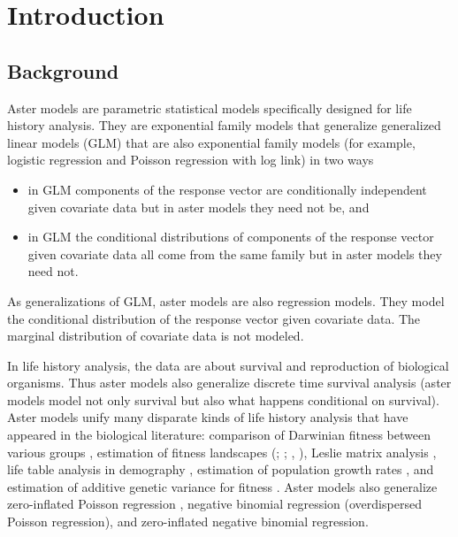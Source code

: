 
\chapter{Introduction}
\label{ch:introduction}

\section{Background}
\label{sec:background}

Aster models \citep*{aster1,aster2,reaster} 
are parametric statistical models
specifically designed for life history analysis.  They are exponential family
models that generalize generalized linear models (GLM) that are also
exponential family models (for example, logistic regression and
Poisson regression with log link) in two ways
\begin{itemize}
\item in GLM components of the response vector are
    conditionally independent given covariate data
    but in aster models they need not be, and
\item in GLM the conditional distributions of components of the
    response vector given covariate data all come from the same family
    but in aster models they need not.
\end{itemize}
As generalizations of GLM, aster models are also regression models.
They model the conditional distribution of the response vector given
covariate data.  The marginal distribution of covariate data is not
modeled.

In life history analysis,
the data are about survival and reproduction
of biological organisms.  Thus aster models also generalize discrete time
survival analysis (aster models model not only survival but also
what happens conditional on survival).
Aster models unify many disparate kinds of life history analysis that have
appeared in the biological literature: comparison of Darwinian fitness between
various groups \citep{aster1,aster2}, estimation of fitness landscapes
(\citealp{lande-arnold}; \citealp{mitchell-olds-shaw}; \citealp{aster2,aster3},
\citealp*{aster-hornworm}),
Leslie matrix analysis
\citep{caswell}, life table analysis in demography \citep{goodman},
estimation of population growth rates
\citep{fisher,lenski-service,aster2,aster-hornworm},
and estimation of additive genetic variance for fitness
\citep{kulbaba-et-al,zenodo}.
Aster models also generalize zero-inflated Poisson regression \citep{lambert},
negative binomial regression (overdispersed Poisson regression),
and zero-inflated negative binomial regression.

